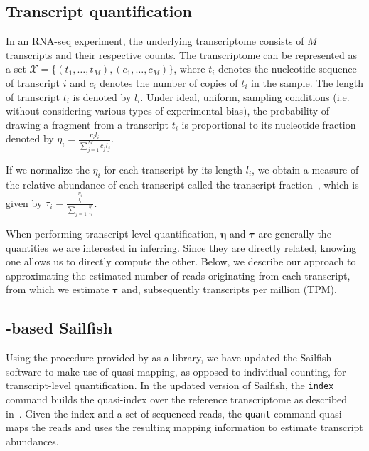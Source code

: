 \subsection{Transcript quantification}

In an RNA-seq experiment, the underlying transcriptome consists of $M$ transcripts and their respective counts. The transcriptome can be represented as a set $\mathcal{X} = \{(t_1,\ldots,t_M),(c_1,\ldots,c_M)\}$, where $t_i$ denotes the nucleotide sequence of transcript $i$ and $c_i$ denotes the number of copies of $t_i$ in the sample. The length of transcript $t_i$ is denoted by $l_i$. Under ideal, uniform, sampling conditions (i.e. without considering various types of experimental bias), the probability of drawing a fragment from a transcript $t_i$ is proportional to its nucleotide fraction~\citep{li2010rna} denoted by $\eta_i = \frac{c_i l_i }{\sum_{j=1}^M c_j l_j}$.

If we normalize the $\eta_i$ for each transcript by its length $l_i$, we obtain a measure of the relative abundance of each transcript called the transcript fraction~\citep{li2010rna}, which is given by $\tau_i = \frac{\frac{\eta_i}{l_i}}{\sum_{j=1} \frac{\eta_i}{l_i}}$.

When performing transcript-level quantification, $\bm{\eta}$ and $\bm{\tau}$ are generally the quantities we are interested in inferring.  Since they are directly related, knowing one allows us to directly compute the other.  Below, we describe our approach to approximating the estimated number of reads originating from each transcript, from which we estimate $\bm{\tau}$ and, subsequently transcripts per million (TPM).

\subsection{\Qm-based Sailfish}

Using the \qm procedure provided by \rapmap as a library, we have updated the Sailfish \citep{patro2014sailfish} software to make use of quasi-mapping, as opposed to individual \kmer counting, for transcript-level quantification. In the updated version of Sailfish, the \texttt{index} command builds the quasi-index over the reference transcriptome as described in~. Given the index and a set of sequenced reads, the \texttt{quant} command quasi-maps the reads and uses the resulting mapping information to estimate transcript abundances.

